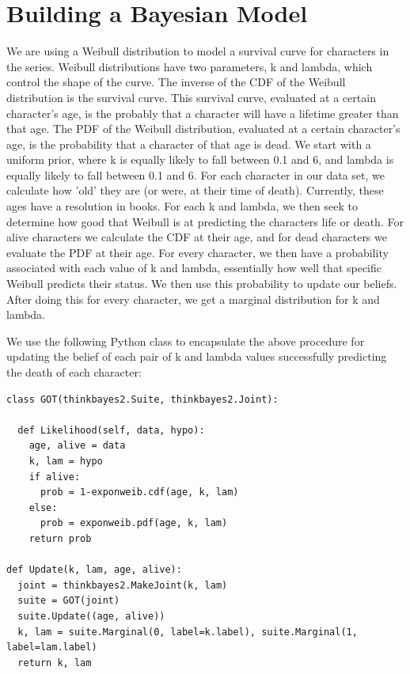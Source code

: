 \documentclass{article}
\begin{document}
\section{Building a Bayesian Model}
We are using a Weibull distribution to model a survival curve for characters in the series.  Weibull distributions have two parameters, k and lambda, which control the shape of the curve.  The inverse of the CDF of the Weibull distribution is the survival curve.  This survival curve, evaluated at a certain character's age, is the probably that a character will have a lifetime greater than that age.  The PDF of the Weibull distribution, evaluated at a certain character's age, is the probability that a character of that age is dead. We start with a uniform prior, where k is equally likely to fall between 0.1 and 6, and lambda is equally likely to fall between 0.1 and 6.  For each character in our data set, we calculate how 'old' they are (or were, at their time of death).  Currently, these ages have a resolution in books. For each k and lambda, we then seek to determine how good that Weibull is at predicting the characters life or death. For alive characters we calculate the CDF at their age, and for dead characters we evaluate the PDF at their age.  For every character, we then have a probability associated with each value of k and lambda, essentially how well that specific Weibull predicts their status.  We then use this probability to update our beliefs.  After doing this for every character, we get a marginal distribution for k and lambda.

We use the following Python class to encapsulate the above procedure for updating the belief of each pair of k and lambda values successfully predicting the death of each character:



\begin{lstlisting}
class GOT(thinkbayes2.Suite, thinkbayes2.Joint):

  def Likelihood(self, data, hypo):
    age, alive = data
    k, lam = hypo
    if alive:
      prob = 1-exponweib.cdf(age, k, lam)
    else:
      prob = exponweib.pdf(age, k, lam)
    return prob

def Update(k, lam, age, alive):
  joint = thinkbayes2.MakeJoint(k, lam)
  suite = GOT(joint)
  suite.Update((age, alive))
  k, lam = suite.Marginal(0, label=k.label), suite.Marginal(1, label=lam.label)
  return k, lam
\end{lstlisting}
\end{document}
